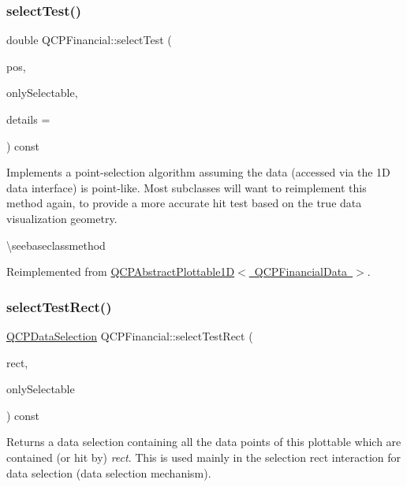 \subsubsection{\texorpdfstring{selectTest()}{selectTest()}}
{\footnotesize\ttfamily double Q\+C\+P\+Financial\+::select\+Test (\begin{DoxyParamCaption}\item[{const Q\+PointF \&}]{pos,  }\item[{bool}]{only\+Selectable,  }\item[{Q\+Variant $\ast$}]{details = {} }\end{DoxyParamCaption}) const\hspace{0.3cm}{\ttfamily [virtual]}}

Implements a point-\/selection algorithm assuming the data (accessed via the 1D data interface) is point-\/like. Most subclasses will want to reimplement this method again, to provide a more accurate hit test based on the true data visualization geometry.

\textbackslash{}seebaseclassmethod 

Reimplemented from \mbox{\hyperlink{class_q_c_p_abstract_plottable1_d_a4611b43bcb6441b2154eb4f4e0a33db2}{Q\+C\+P\+Abstract\+Plottable1\+D$<$ Q\+C\+P\+Financial\+Data $>$}}.

\mbox{\label{class_q_c_p_financial_a3c5beb1ab028a1dba845fc9dcffc7cf4}} 
\subsubsection{\texorpdfstring{selectTestRect()}{selectTestRect()}}
{\footnotesize\ttfamily \mbox{\hyperlink{class_q_c_p_data_selection}{Q\+C\+P\+Data\+Selection}} Q\+C\+P\+Financial\+::select\+Test\+Rect (\begin{DoxyParamCaption}\item[{const Q\+RectF \&}]{rect,  }\item[{bool}]{only\+Selectable }\end{DoxyParamCaption}) const\hspace{0.3cm}{\ttfamily [virtual]}}





Returns a data selection containing all the data points of this plottable which are contained (or hit by) {\itshape rect}. This is used mainly in the selection rect interaction for data selection (data selection mechanism).

